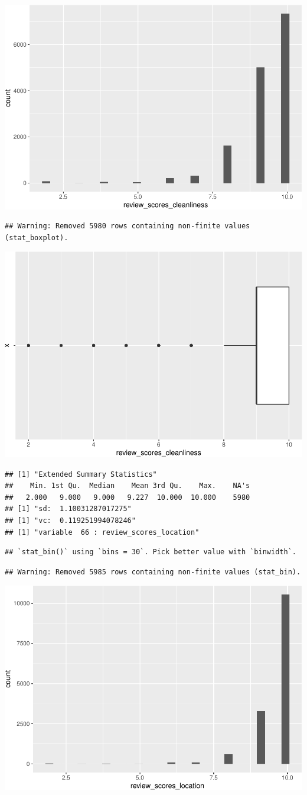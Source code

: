\includegraphics[width=0.5\linewidth]{anal_files/figure-latex/figures-side-46}

\begin{verbatim}
## Warning: Removed 5980 rows containing non-finite values (stat_boxplot).
\end{verbatim}

\includegraphics[width=0.5\linewidth]{anal_files/figure-latex/figures-side-47}

\begin{verbatim}
## [1] "Extended Summary Statistics"
##    Min. 1st Qu.  Median    Mean 3rd Qu.    Max.    NA's 
##   2.000   9.000   9.000   9.227  10.000  10.000    5980 
## [1] "sd:  1.10031287017275"
## [1] "vc:  0.119251994078246"
## [1] "variable  66 : review_scores_location"
\end{verbatim}

\begin{verbatim}
## `stat_bin()` using `bins = 30`. Pick better value with `binwidth`.
\end{verbatim}

\begin{verbatim}
## Warning: Removed 5985 rows containing non-finite values (stat_bin).
\end{verbatim}

\includegraphics[width=0.5\linewidth]{anal_files/figure-latex/figures-side-48}

